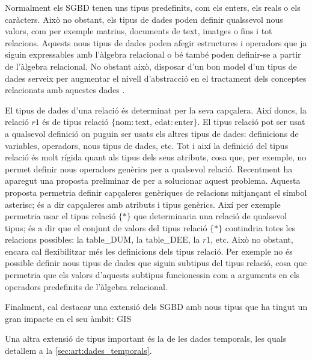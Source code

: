 Normalment els SGBD tenen uns tipus predefinits, com els enters, els
reals o els caràcters. Això no obstant, els tipus de dades poden
definir qualssevol nous valors, com per exemple matrius, documents de
text, imatges o fins i tot relacions.  Aquests nous tipus de dades
poden afegir estructures i operadors que ja siguin expressables amb
l'àlgebra relacional o bé també poden definir-se a partir de l'àlgebra
relacional. No obstant això, disposar d'un bon model d'un tipus de
dades serveix per augmentar el nivell d'abstracció en el tractament
dels conceptes relacionats amb aquestes dades
\parencite{date02:_tempor_data_relat_model}. %


El tipus de dades d'una relació és determinat per la seva capçalera.
Així doncs, la relació $r1$ és de tipus relació $\{\text{nom}:
\text{text},\, \text{edat}:\text{enter} \}$.  El tipus relació pot ser
usat a qualsevol definició on puguin ser usats els altres tipus de
dades: definicions de variables, operadors, nous tipus de dades,
etc. Tot i així la definició del tipus relació és molt rígida quant
als tipus dels seus atributs, cosa que, per exemple, no permet definir
nous operadors genèrics per a qualsevol relació.  Recentment ha
aparegut una proposta preliminar de
\textcite{darwen13:generic_relation_type} per a solucionar aquest
problema. Aquesta proposta permetria definir capçaleres genèriques de
relacions mitjançant el símbol asterisc; és a dir capçaleres amb
atributs i tipus genèrics. Així per exemple permetria usar el tipus
relació $\{ * \}$ que determinaria una relació de qualsevol tipus; és
a dir que el conjunt de valors del tipus relació $\{ * \}$ contindria
totes les relacions possibles: la table\_DUM, la table\_DEE, la $r1$,
etc. Això no obstant, encara cal flexibilitzar més les definicions
dels tipus relació. Per exemple no és possible definir nous tipus de
dades que siguin subtipus del tipus relació, cosa que permetria que
els valors d'aquests subtipus funcionessin com a arguments en els
operadors predefinits de l'àlgebra relacional.



\todo{}


Finalment, cal destacar una extensió dels SGBD amb nous tipus que ha
tingut un gran impacte en el seu àmbit: GIS




Una altra extensió de tipus important és la de les dades temporals,
les quals detallem a la \autoref{sec:art:dades_temporals}.






